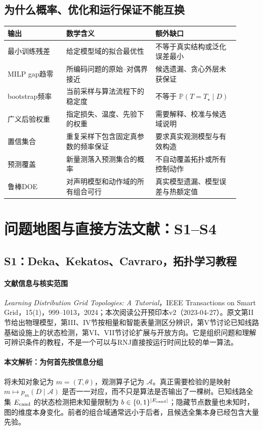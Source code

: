 \documentclass[UTF8,11pt,fontset=fandol]{ctexart}
\newcommand{\Prob}{\mathbb{P}}
\theoremstyle{remark}
\numberwithin{equation}{section}
\begin{document}
\subsection{为什么概率、优化和运行保证不能互换}
\begin{longtable}{p{0.23\linewidth}p{0.35\linewidth}p{0.33\linewidth}}
\toprule 输出 & 数学含义 & 额外缺口\\\midrule\endhead
最小训练残差 & 给定模型域的拟合最优性 & 不等于真实结构或泛化误差最小\\
MILP gap趋零 & 所编码问题的原始--对偶界接近 & 候选遗漏、贪心外层未获保证\\
bootstrap频率 & 当前采样与算法流程下的稳定度 & 不等于 $\Prob(T=T_\star\mid D)$\\
广义后验权重 & 指定损失、温度、先验下的权重 & 需要解释、校准与候选域说明\\
置信集合 & 重复采样下包含固定真参数的频率保证 & 要求真实观测模型与有效构造\\
预测覆盖 & 新量测落入预测集合的概率 & 不自动覆盖拓扑或所有控制动作\\
鲁棒DOE & 对声明模型和动作域的所有组合可行 & 真实模型遗漏、模型误差与热额定值\\
\bottomrule
\end{longtable}



\clearpage

\section{问题地图与直接方法文献：S1--S4}
\subsection{S1：Deka、Kekatos、Cavraro，拓扑学习教程}
\paragraph{文献信息与核实范围}
\emph{Learning Distribution Grid Topologies: A Tutorial}，IEEE Transactions on Smart Grid，15(1)，999--1013，2024；本次阅读公开预印本v2（2023-04-27）。原文第II节给出物理模型，第III、IV节按相量和智能表量测区分辨识，第V节讨论已知线路基础设施上的状态检测，第VI、VII节讨论扩展与开放方向\citep{S1}。它是组织问题和理解可辨识条件的教程，不是一个可以与RNJ直接按运行时间比较的单一算法。

\paragraph{本文解析：为何首先按信息分组}
将未知对象记为 $m=(T,\theta)$，观测算子记为 $\mathcal A$。真正需要检验的是映射 $m\mapsto p_m(D\mid\mathcal A)$ 是否一一对应，而不只是算法是否输出了一棵树。已知线路全集 $E_{\rm cand}$ 的状态检测把未知量限制为 $b\in\{0,1\}^{|E_{\rm cand}|}$；隐藏节点数量也未知时，图的维度本身变化。前者的组合域通常远小于后者，且候选全集本身已经包含大量先验。
\end{document}
